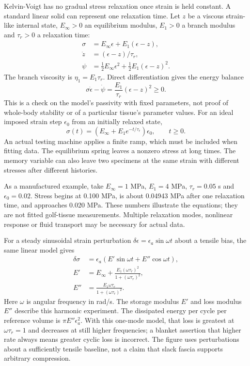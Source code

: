 Kelvin-Voigt has no gradual stress relaxation once strain is held constant. A standard linear solid can represent one relaxation time. Let $z$ be a viscous strain-like internal state, $E_\infty>0$ an equilibrium modulus, $E_1>0$ a branch modulus and $\tau_r>0$ a relaxation time:
\[
\begin{aligned}
\sigma&=E_\infty\epsilon+E_1(\epsilon-z),\\
\dot z&=(\epsilon-z)/\tau_r,\\
\psi&=\tfrac12 E_\infty\epsilon^2+\tfrac12 E_1(\epsilon-z)^2.
\end{aligned}
\]
The branch viscosity is $\eta_1=E_1\tau_r$. Direct differentiation gives the energy balance
\[
\sigma\dot\epsilon-\dot\psi
=\frac{E_1}{\tau_r}(\epsilon-z)^2\geq0.
\]
This is a check on the model's passivity with fixed parameters, not proof of whole-body stability or of a particular tissue's parameter values. For an ideal imposed strain step $\epsilon_0$ from an initially relaxed state,
\[
\sigma(t)=\left(E_\infty+E_1e^{-t/\tau_r}\right)\epsilon_0,
\qquad t\geq0.
\]
An actual testing machine applies a finite ramp, which must be included when fitting data. The equilibrium spring leaves a nonzero stress at long times. The memory variable can also leave two specimens at the same strain with different stresses after different histories.

As a manufactured example, take $E_\infty=1$ MPa, $E_1=4$ MPa, $\tau_r=0.05$ s and $\epsilon_0=0.02$. Stress begins at 0.100 MPa, is about 0.04943 MPa after one relaxation time, and approaches 0.020 MPa. These numbers illustrate the equations; they are not fitted golf-tissue measurements. Multiple relaxation modes, nonlinear response or fluid transport may be necessary for actual data.

For a steady sinusoidal strain perturbation $\delta\epsilon=\epsilon_a\sin\omega t$ about a tensile bias, the same linear model gives
\[
\begin{aligned}
\delta\sigma&=\epsilon_a(E'\sin\omega t+E''\cos\omega t),\\
E'&=E_\infty+\frac{E_1(\omega\tau_r)^2}{1+(\omega\tau_r)^2},\\
E''&=\frac{E_1\omega\tau_r}{1+(\omega\tau_r)^2}.
\end{aligned}
\]
Here $\omega$ is angular frequency in rad/s. The storage modulus $E'$ and loss modulus $E''$ describe this harmonic experiment. The dissipated energy per cycle per reference volume is $\pi E''\epsilon_a^2$. With this one-mode model, that loss is greatest at $\omega\tau_r=1$ and decreases at still higher frequencies; a blanket assertion that higher rate always means greater cyclic loss is incorrect. The figure uses perturbations about a sufficiently tensile baseline, not a claim that slack fascia supports arbitrary compression.


